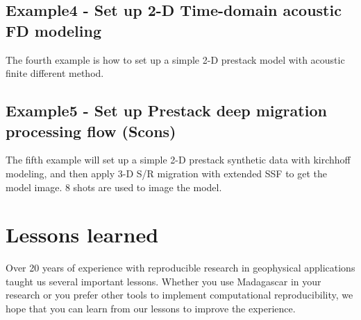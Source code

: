 \subsection{Example4 - Set up 2-D Time-domain acoustic FD modeling}

The fourth example is how to set up a simple 2-D prestack model with acoustic 
finite different method.



\clearpage

\subsection{Example5 - Set up Prestack deep migration processing flow (Scons)}

The fifth example will set up a simple 2-D prestack synthetic data
with kirchhoff modeling, and then apply 3-D S/R migration with
extended SSF to get the model image. 8 shots are used to image the
model.




\section{Lessons learned}

Over 20 years of experience with reproducible research in geophysical
applications taught us several important lessons. Whether you use
Madagascar in your research or you prefer other tools to implement
computational reproducibility, we hope that you can learn from our
lessons to improve the experience.

